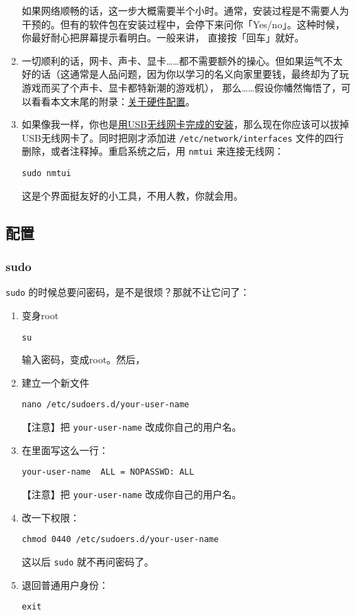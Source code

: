\documentclass{wx672ctexart}
\begin{document}
\begin{enumerate}
如果网络顺畅的话，这一步大概需要半个小时。通常，安装过程是不需要人为干预的。但有的软件包在安装过程中，会停下来问你「Yes/no」。这种时候，你最好耐心把屏幕提示看明白。一般来讲，
直接按「回车」就好。
\item 一切顺利的话，网卡、声卡、显卡……都不需要额外的操心。但如果运气不太好的话（这通常是人品问题，因为你以学习的名义向家里要钱，最终却为了玩游戏而买了个声卡、显卡都特新潮的游戏机），
那么……假设你幡然悔悟了，可以看看本文末尾的附录：\hyperref[sec:org57926af]{关于硬件配置}。
\item 如果像我一样，你也是\hyperref[sec:orgc0a8978]{用USB无线网卡完成的安装}，那么现在你应该可以拔掉USB无线网卡了。同时把刚才添加进 \texttt{/etc/network/interfaces} 文件的四行删除，或者注释掉。重启系统之后，用
\texttt{nmtui} 来连接无线网：
\begin{verbatim}
sudo nmtui
\end{verbatim}
这是个界面挺友好的小工具，不用人教，你就会用。
\end{enumerate}

\subsection{配置}
\label{sec:orgadd5732}

\subsubsection{sudo}
\label{sec:org070412a}
\texttt{sudo} 的时候总要问密码，是不是很烦？那就不让它问了：
\begin{enumerate}
\item 变身root
\begin{verbatim}
su
\end{verbatim}
输入密码，变成root。然后，
\item 建立一个新文件
\begin{verbatim}
nano /etc/sudoers.d/your-user-name
\end{verbatim}
【注意】把 \texttt{your-user-name} 改成你自己的用户名。
\item 在里面写这么一行：
\begin{verbatim}
your-user-name  ALL = NOPASSWD: ALL
\end{verbatim}

【注意】把 \texttt{your-user-name} 改成你自己的用户名。
\item 改一下权限：
\begin{verbatim}
chmod 0440 /etc/sudoers.d/your-user-name
\end{verbatim}
这以后 \texttt{sudo} 就不再问密码了。
\item 退回普通用户身份：
\begin{verbatim}
exit
\end{verbatim}
\end{enumerate}
\end{document}
